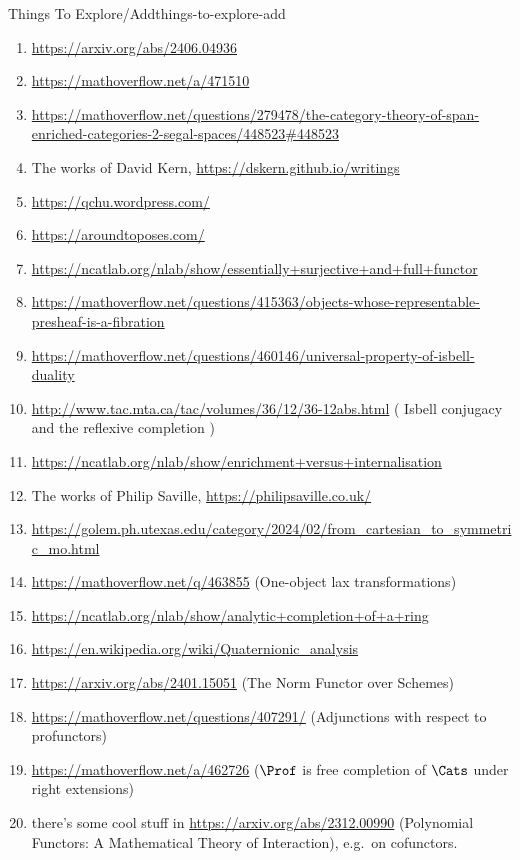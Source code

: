 \begin{remark}{Things To Explore/Add}{things-to-explore-add}
\begin{enumerate}
\begin{enumerate}
            \end{enumerate}
        \item \url{https://arxiv.org/abs/2406.04936}
        \item \url{https://mathoverflow.net/a/471510}
        \item \url{https://mathoverflow.net/questions/279478/the-category-theory-of-span-enriched-categories-2-segal-spaces/448523#448523}
        \item The works of David Kern, \url{https://dskern.github.io/writings}
        \item \url{https://qchu.wordpress.com/}
        \item \url{https://aroundtoposes.com/}
        \item \url{https://ncatlab.org/nlab/show/essentially+surjective+and+full+functor}
        \item \url{https://mathoverflow.net/questions/415363/objects-whose-representable-presheaf-is-a-fibration}
        \item \url{https://mathoverflow.net/questions/460146/universal-property-of-isbell-duality}
        \item \url{http://www.tac.mta.ca/tac/volumes/36/12/36-12abs.html} ( Isbell conjugacy and the reflexive completion )
        \item \url{https://ncatlab.org/nlab/show/enrichment+versus+internalisation}
        \item The works of Philip Saville, \url{https://philipsaville.co.uk/}
        \item \url{https://golem.ph.utexas.edu/category/2024/02/from\_cartesian\_to\_symmetric\_mo.html}
        \item \url{https://mathoverflow.net/q/463855} (One-object lax transformations)
        \item \url{https://ncatlab.org/nlab/show/analytic+completion+of+a+ring}
        \item \url{https://en.wikipedia.org/wiki/Quaternionic\_analysis}
        \item \url{https://arxiv.org/abs/2401.15051} (The Norm Functor over Schemes)
        \item \url{https://mathoverflow.net/questions/407291/} (Adjunctions with respect to profunctors)
        \item \url{https://mathoverflow.net/a/462726} ($\Prof$ is free completion of $\Cats$ under right extensions)
        \item there's some cool stuff in \url{https://arxiv.org/abs/2312.00990} (Polynomial Functors: A Mathematical Theory of Interaction), e.g.\ on cofunctors.

\end{enumerate}
\end{remark}
